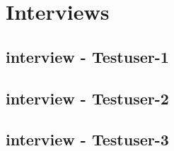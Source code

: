 \documentclass[runningheads,a4paper]{llncs}
\begin{document}
\clearpage



\section{Interviews}

\subsection{interview - Testuser-1}
\subsection{interview - Testuser-2}
\subsection{interview - Testuser-3}
\clearpage




\begin{thebibliography}{1}
\end{thebibliography}
\end{document}
